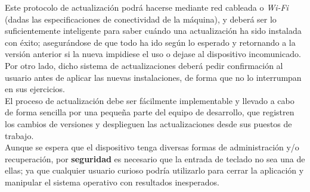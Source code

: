 Este protocolo de actualización podrá hacerse mediante red cableada o \textit{Wi-Fi} (dadas las especificaciones de conectividad de la máquina), y deberá ser lo suficientemente inteligente para saber cuándo una actualización ha sido instalada con éxito; asegurándose de que todo ha ido según lo esperado y retornando a la versión anterior si la nueva impidiese el uso o dejase al dispositivo incomunicado. Por otro lado, dicho sistema de actualizaciones deberá pedir confirmación al usuario antes de aplicar las nuevas instalaciones, de forma que no lo interrumpan en sus ejercicios.\\

El proceso de actualización debe ser fácilmente implementable y llevado a cabo de forma sencilla por una pequeña parte del equipo de desarrollo, que registren los cambios de versiones y desplieguen las actualizaciones desde sus puestos de trabajo.\\

Aunque se espera que el dispositivo tenga diversas formas de administración y/o recuperación, por \textbf{seguridad} es necesario que la entrada de teclado no sea una de ellas; ya que cualquier usuario curioso podría utilizarlo para cerrar la aplicación y manipular el sistema operativo con resultados inesperados.\\

\newpage